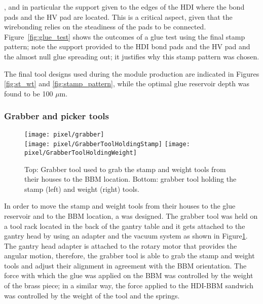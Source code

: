 \item {}, and in particular the support given to the edges of the HDI where the bond pads and the HV pad are located. This is a critical aspect, given that the wirebonding relies on the steadiness of the pads to be connected. Figure~\ref{fig:glue_test} shows the outcomes of a glue test using the final stamp pattern; note the support provided to the HDI bond pads and the HV pad and the almost null glue spreading out; it justifies why this stamp pattern was chosen.   
\eit

The final tool designs used during the module production are indicated in Figures \ref{fig:st_wt} and \ref{fig:stamp_pattern}, while the optimal glue reservoir depth was found to be 100 $\mu$m. 

\subsubsection*{Grabber and picker tools}

\begin{figure}[!h]
  \centering  
  \texttt{[image: pixel/grabber]}\\
  \texttt{[image: pixel/GrabberToolHoldingStamp]}
  \texttt{[image: pixel/GrabberToolHoldingWeight]}
  \caption[Grabber tool.]{Top: Grabber tool used to grab the stamp and weight tools from their houses to the BBM location. Bottom: grabber tool holding the stamp (left) and weight (right) tools.}\label{fig:grabber_tool}
\end{figure}

In order to move the stamp and weight tools from their houses to the glue reservoir and to the BBM location, a  was designed. The grabber tool was held on a tool rack located in the back of the gantry table and it gets attached to the gantry head by using an adapter and the vacuum system as shown in Figure\ref{fig:grabber_tool}. The gantry head adapter is attached to the rotary motor that provides the angular motion, therefore, the grabber tool is able to grab the stamp and weight tools and adjust their alignment in agreement with the BBM orientation. The force with which the glue was applied on the BBM was controlled by the weight of the brass piece; in a similar way, the force applied to the HDI-BBM sandwich was controlled by the weight of the tool and the springs.                  

